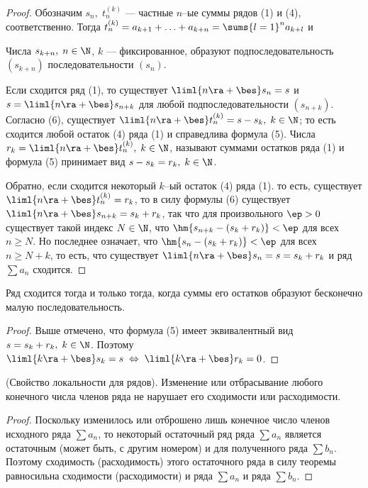 \documentclass[a4paper]{article}
\begin{document}
\begin{proof}
Обозначим $s_n, \; t^{(k)}_n$ --- частные $n$--ые суммы рядов (1) и
(4), соответственно. Тогда $t^{(k)}_n=a_{k+1} + \ldots + a_{k+n} =
\sums{l=1}^n a_{k+l}$ и 

Числа $s_{k+n}, \; n\in\N$, $k$ --- фиксированное, образуют
подпоследовательность $(s_{k+n})$ последовательности $(s_n)$.

Если сходится ряд (1), то существует $\liml{n\ra+\bes}s_n=s$ и
$s=\liml{n\ra+\bes} s_{n+k}$ для любой подпоследовательности
$(s_{n+k})$. Согласно (6), существует $\liml{n\ra+\bes} t^{(k)}_n =s
- s_k, \; k\in\N$; то есть сходится любой остаток (4) ряда (1) и
справедлива формула (5). Числа $r_k = \liml{n\ra+\bes} t^{(k)}_n, \;
k\in\N$, называют суммами остатков ряда (1) и формула (5) принимает
вид $s-s_k = r_k, \; k\in\N$.

Обратно, если сходится некоторый $k$--ый остаток (4) ряда (1). то
есть, существует $\liml{n\ra+\bes} t^{(k)}_n=r_k$, то в силу формулы
(6) существует $\liml{n\ra+\bes} s_{n+k} = s_k+r_k$, так что для
произвольного $\ep>0$ существует такой индекс $N\in\N$, что
$\hm{s_{n+k} - (s_k+r_k)}<\ep$ для всех $n\ge N$. Но последнее
означает, что $\hm{s_n - (s_k+r_k)}<\ep$ для всех $n\ge N+k$, то
есть, что существует $\liml{n\ra+\bes} s_n = s = s_k+r_k$ и ряд
$\sum a_n$ сходится.
\end{proof}

\begin{imp}
Ряд сходится тогда и только тогда, когда суммы его остатков образуют
бесконечно малую последовательность.
\end{imp}

\begin{proof}
Выше отмечено, что формула (5) имеет эквивалентный вид $s=s_k+r_k,
\; k\in\N$. Поэтому $\liml{k\ra+\bes} s_k = s \; \Leftrightarrow \;
\liml{k\ra+\bes} r_k =0$.
\end{proof}

\begin{imp}
(Свойство локальности для рядов). Изменение или отбрасывание любого
конечного числа членов ряда не нарушает его сходимости или
расходимости.
\end{imp}

\begin{proof}
Поскольку изменилось или отброшено лишь конечное число членов
исходного ряда $\sum a_n$, то некоторый остаточный ряд ряда $\sum
a_n$ является остаточным (может быть, с другим номером) и для
полученного ряда $\sum b_n$. Поэтому сходимость (расходимость) этого
остаточного ряда в силу теоремы равносильна сходимости
(расходимости) и ряда $\sum a_n$ и ряда $\sum b_n$.
\end{proof}
\end{document}
